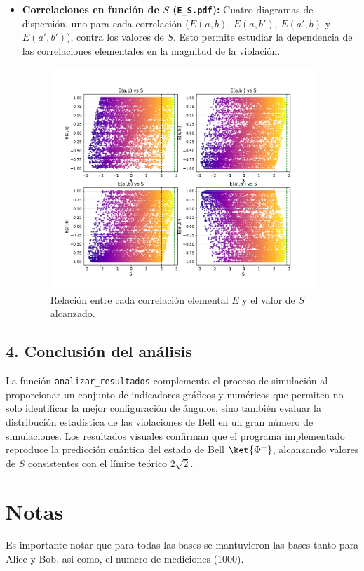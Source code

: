 \documentclass[11pt]{article}
\begin{document}
\begin{itemize}
    \item \textbf{Correlaciones en función de $S$ (\texttt{E\_S.pdf}):}  
    Cuatro diagramas de dispersión, uno para cada correlación ($E(a,b)$, $E(a,b')$, $E(a',b)$ y $E(a',b')$), contra los valores de $S$. Esto permite estudiar la dependencia de las correlaciones elementales en la magnitud de la violación.
    
    \begin{figure}[H]
        \centering
        \includegraphics[width=0.95\textwidth]{Figures/E_S.pdf}
        \caption{Relación entre cada correlación elemental $E$ y el valor de $S$ alcanzado.}
    \end{figure}
\end{itemize}


\subsection*{4. Conclusión del análisis}
La función \texttt{analizar\_resultados} complementa el proceso de simulación al proporcionar un conjunto de indicadores gráficos y numéricos que permiten no solo identificar la mejor configuración de ángulos, sino también evaluar la distribución estadística de las violaciones de Bell en un gran número de simulaciones. Los resultados visuales confirman que el programa implementado reproduce la predicción cuántica del estado de Bell $\ket{\Phi^+}$, alcanzando valores de $S$ consistentes con el límite teórico $2\sqrt{2}$.





\section{Notas}

Es importante notar que para todas las bases se mantuvieron las bases tanto para Alice y Bob, asi como, el numero de mediciones (1000).
\end{document}
